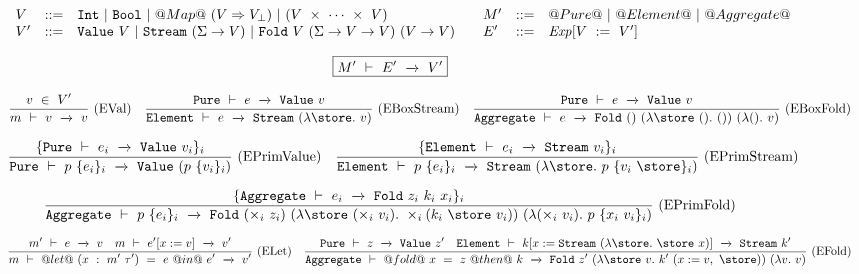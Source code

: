 
\begin{figure*}

$$
\begin{array}{ll}

\begin{array}{lll}
V & ::= & \NN~|~\BB~|~@Map@~(V \Rightarrow V_\bot)~|~(V~\times~\cdots~\times~V) \\
V'& ::= & \VValue{V}~|~\VStream{(\Sigma \to V)}~|~\VFold{V}{(\Sigma \to V \to V)}{(V \to V)}
\end{array}

&

\begin{array}{lll}
M'& ::= & @Pure@~|~@Element@~|~@Aggregate@ \\
E'& ::= & \mi{Exp}[V~:=~V']
\end{array}

\end{array}
$$

$$
\boxed{M'~\vdash~E'~\xrightarrow~~V'}
$$

$$
\ruleIN
{
    v~\in~V'
}
{
    \SourceStepX{m}{v}{v}
}{EVal}
\ruleIN
{
    \SourceStepXP{e}{\VValue{v}}
}
{
    \SourceStepXE{e}{\VStream{(\lam{\store} v)}}
}{EBoxStream}
\ruleIN
{
    \SourceStepXP{e}{\VValue{v}}
}
{
    \SourceStepXA{e}{\VFold{()}{(\lam{\store~()} ())}{(\lam{()} v)}}
}{EBoxFold}
$$

$$
\ruleIN
{
  \{ \SourceStepXP{e_i}{\VValue{v_i}} \}_i
}
{
  \SourceStepXP
    {p~\{ e_i \}_i }
    {\VValue{(p~\{v_i\}_i)}}
}{EPrimValue}
\ruleIN
{
  \{ \SourceStepXE{e_i}{\VStream{v_i}} \}_i
}
{
  \SourceStepXE
    {p~\{ e_i \}_i }
    {\VStream{(\lam{\store} p~\{v_i~\store\}_i)}}
}{EPrimStream}
$$

$$
\ruleIN
{
  \{ \SourceStepXA{e_i}{\VFold{z_i}{k_i}{x_i}} \}_i
}
{
  \SourceStepXA
    {p~\{ e_i \}_i }
    {\VFold
      {(\times_i~z_i)}
      {(\lam{\store~(\times_i~v_i)}
        \times_i (k_i~\store~v_i))}
      {(\lam{(\times_i~v_i)}
        p~\{x_i~v_i\}_i)}}
}{EPrimFold}
$$

$$
\ruleIN
{
  \SourceStepX{m'}{e}{v}
  \quad
  \SourceStepX{m}{e'[x:=v]}{v'}
}
{
  \SourceStepX
    {m}
    {@let@~(x~:~m'~\tau')~=~e~@in@~e'}
    {v'}
}{ELet}
\ruleIN
{
  \SourceStepXP{z}{\VValue{z'}}
  \quad
  \SourceStepXE{k[x:=\VStream{(\lam{\store} \store~x)}]}{\VStream{k'}}
}
{
  \SourceStepXA
    {@fold@~x~=~z~@then@~k}
    {\VFold
      {z'}
      {(\lam{\store~v} k'~(x:=v,~\store))}
      {(\lam{v} v)}}
}{EFold}
$$


\end{figure*}
